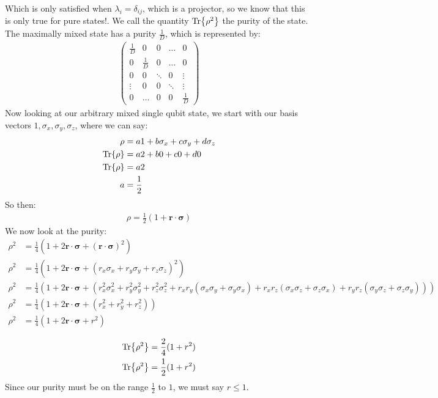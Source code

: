 Which is only satisfied when $\lambda_i = \delta_{ij}$, which is a projector, so we know that this is only true for pure states!. We call the quantity $\Tr{\rho^2}$ the purity of the state. \\
The maximally mixed state has a purity $\frac{1}{D}$, which is represented by:
\begin{align*}
	\begin{pmatrix}
		\frac{1}{D} & 0 & 0 & \ldots & 0 \\
		0 & \frac{1}{D} & 0 & \ldots & 0 \\
		0 & 0& \ddots & 0 & \vdots \\
		\vdots & 0& 0 & \ddots & \vdots \\
		0 & \ldots & 0  & 0 &\frac{1}{D}
	\end{pmatrix}
\end{align*}
Now looking at our arbitrary mixed single qubit state, we start with our basis vectors $1,\sigma_x,\sigma_y,\sigma_z$, where we can say:
\begin{align*}
	\rho &= a1+ b\sigma_x + c\sigma_y + d\sigma_z \\
	\Tr{\rho} &= a2+ b0 + c0 + d0 \\
	\Tr{\rho} &= a2 \\
	a &= \frac{1}{2}
\end{align*}
So then:
\begin{align*}
	\rho = \frac{1}{2}(1 + \bm{r}\cdot\bm{\sigma})
\end{align*}
We now look at the purity:
\begin{align*}
	\rho^2 &= \frac{1}{4}(1 + 2\bm{r}\cdot\bm{\sigma} + (\bm{r}\cdot\bm{\sigma})^2) \\
	\rho^2 &= \frac{1}{4}(1 + 2\bm{r}\cdot\bm{\sigma} + (r_x\sigma_x + r_y\sigma_y + r_z\sigma_z)^2) \\
	\rho^2 &= \frac{1}{4}(1 + 2\bm{r}\cdot\bm{\sigma} + (r_x^2\sigma_x^2 + r_y^2\sigma_y^2 + r_z^2\sigma_z^2 + r_xr_y(\sigma_x\sigma_y + \sigma_y\sigma_x) + r_xr_z(\sigma_x\sigma_z + \sigma_z\sigma_x) + r_yr_z(\sigma_y\sigma_z + \sigma_z\sigma_y))) \\
	\rho^2 &= \frac{1}{4}(1 + 2\bm{r}\cdot\bm{\sigma} + (r_x^2 + r_y^2 + r_z^2)) \\
	\rho^2 &= \frac{1}{4}(1 + 2\bm{r}\cdot\bm{\sigma} + r^2) \\
\end{align*}
\begin{align*}
	\Tr{\rho^2} &= \frac{2}{4}(1 +  r^2) \\
	\Tr{\rho^2} &= \frac{1}{2}(1 +  r^2)
\end{align*}
Since our purity must be on the range $\frac{1}{2}$ to $1$, we must say $r \leq 1$.
